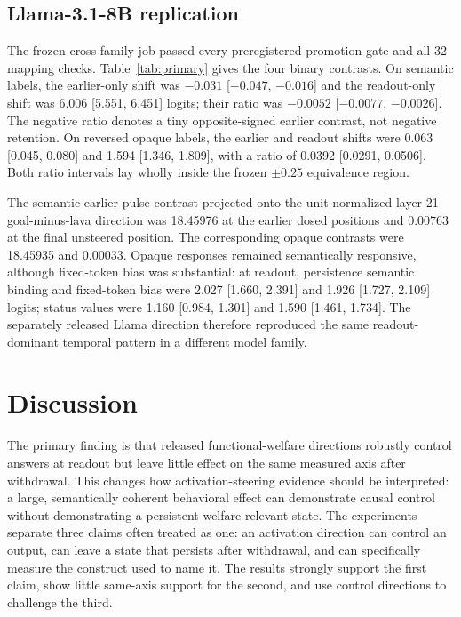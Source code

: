 \documentclass[10pt,twocolumn]{article}
\begin{document}
\subsection{Llama-3.1-8B replication}

The frozen cross-family job passed every preregistered promotion gate and all 32 mapping checks. Table~\ref{tab:primary} gives the four binary contrasts. On semantic labels, the earlier-only shift was $-0.031$ [$-0.047$, $-0.016$] and the readout-only shift was 6.006 [5.551, 6.451] logits; their ratio was $-0.0052$ [$-0.0077$, $-0.0026$]. The negative ratio denotes a tiny opposite-signed earlier contrast, not negative retention. On reversed opaque labels, the earlier and readout shifts were 0.063 [0.045, 0.080] and 1.594 [1.346, 1.809], with a ratio of 0.0392 [0.0291, 0.0506]. Both ratio intervals lay wholly inside the frozen $\pm0.25$ equivalence region.

The semantic earlier-pulse contrast projected onto the unit-normalized layer-21 goal-minus-lava direction was 18.45976 at the earlier dosed positions and 0.00763 at the final unsteered position. The corresponding opaque contrasts were 18.45935 and 0.00033. Opaque responses remained semantically responsive, although fixed-token bias was substantial: at readout, persistence semantic binding and fixed-token bias were 2.027 [1.660, 2.391] and 1.926 [1.727, 2.109] logits; status values were 1.160 [0.984, 1.301] and 1.590 [1.461, 1.734]. The separately released Llama direction therefore reproduced the same readout-dominant temporal pattern in a different model family.

\section{Discussion}

The primary finding is that released functional-welfare directions robustly control answers at readout but leave little effect on the same measured axis after withdrawal. This changes how activation-steering evidence should be interpreted: a large, semantically coherent behavioral effect can demonstrate causal control without demonstrating a persistent welfare-relevant state. The experiments separate three claims often treated as one: an activation direction can control an output, can leave a state that persists after withdrawal, and can specifically measure the construct used to name it. The results strongly support the first claim, show little same-axis support for the second, and use control directions to challenge the third.
\end{document}
